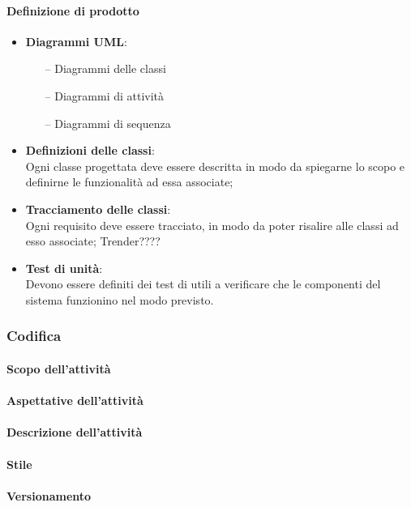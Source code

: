  \paragraph{Definizione di prodotto}
\begin{itemize}
	\item \textbf{Diagrammi UML}:
	\begin{itemize}
		\item[--] Diagrammi delle classi
		\item[--] Diagrammi di attività
		\item[--] Diagrammi di sequenza
	\end{itemize}
	\item \textbf{Definizioni delle classi}:\\Ogni classe progettata deve essere descritta in modo da spiegarne lo scopo e definirne le
funzionalità ad essa associate;
	\item \textbf{Tracciamento delle classi}:\\Ogni requisito deve essere tracciato, in modo da poter risalire alle classi ad esso associate; Trender????
	\item \textbf{Test di unità}:\\Devono essere definiti dei test di  utili a verificare che le componenti del sistema
funzionino nel modo previsto.
\end{itemize}

\subsubsection{Codifica}
 \paragraph{Scopo dell'attività}
 
 \paragraph{Aspettative dell'attività}

 \paragraph{Descrizione dell'attività}

 \paragraph{Stile}

 \paragraph{Versionamento}

